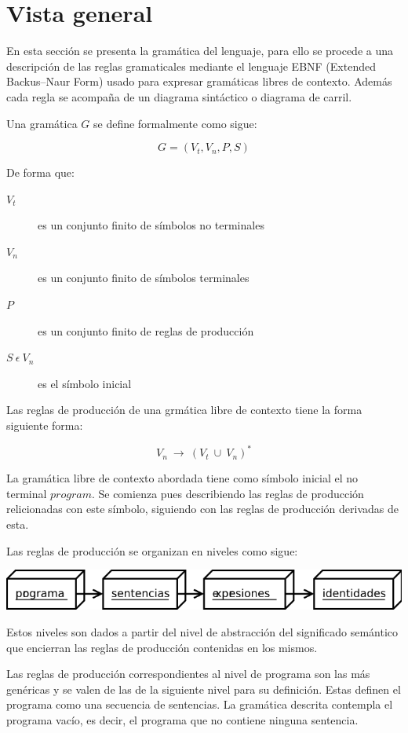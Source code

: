 \section{Vista general}
En esta sección se presenta la gramática del lenguaje, para ello 
se procede a una descripción de las reglas gramaticales
 mediante el lenguaje EBNF (Extended Backus–Naur Form) 
usado para expresar gramáticas libres de contexto. Además cada regla se acompaña de un
diagrama sintáctico o diagrama de carril. 

Una gramática $G$ se define formalmente como sigue:

$$G = (V_t,V_n, P, S)$$

De forma que:

\begin{description}
\item[$V_t$] es un conjunto finito de símbolos no terminales
\item[$V_n$] es un conjunto finito de símbolos terminales
\item[$P$] es un conjunto finito de reglas de producción
\item[$S\ \epsilon\ V_n$] es el símbolo inicial
\end{description}

Las reglas de producción de una grmática libre de contexto tiene la forma siguiente forma:

$$V_n\ \rightarrow\ (V_t\ \cup\ V_n)^*$$ 

La gramática libre de contexto abordada tiene como símbolo inicial 
el no terminal $program$. Se comienza pues describiendo las reglas de producción 
relicionadas con este símbolo, siguiendo con las reglas de producción derivadas 
de esta. 

Las reglas de producción se organizan en niveles como sigue:

\begin{center}
\includegraphics[scale=0.7]{diagram/omi.png} \\
\end{center}

Estos niveles son dados a partir del nivel de abstracción del significado 
semántico que encierran las reglas de producción contenidas en los mismos.

Las reglas de producción correspondientes al nivel de programa 
son las más genéricas y se valen de las de la siguiente nivel para 
su definición. Estas definen el programa como una secuencia de
sentencias. La gramática descrita contempla el programa vacío, es decir,
el programa que no contiene ninguna sentencia.

